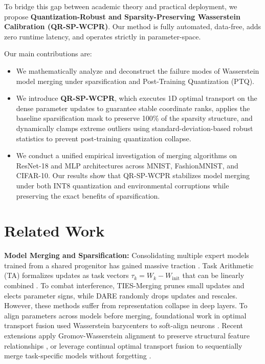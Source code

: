 \documentclass{article}
\theoremstyle{plain}
\theoremstyle{definition}
\theoremstyle{remark}
\begin{document}
To bridge this gap between academic theory and practical deployment, we propose \textbf{Quantization-Robust and Sparsity-Preserving Wasserstein Calibration (QR-SP-WCPR)}. Our method is fully automated, data-free, adds zero runtime latency, and operates strictly in parameter-space. 

Our main contributions are:
\begin{itemize}
    \item We mathematically analyze and deconstruct the failure modes of Wasserstein model merging under sparsification and Post-Training Quantization (PTQ).
    \item We introduce \textbf{QR-SP-WCPR}, which executes 1D optimal transport on the dense parameter updates to guarantee stable coordinate ranks, applies the baseline sparsification mask to preserve 100\% of the sparsity structure, and dynamically clamps extreme outliers using standard-deviation-based robust statistics to prevent post-training quantization collapse.
    \item We conduct a unified empirical investigation of merging algorithms on ResNet-18 and MLP architectures across MNIST, FashionMNIST, and CIFAR-10. Our results show that QR-SP-WCPR stabilizes model merging under both INT8 quantization and environmental corruptions while preserving the exact benefits of sparsification.
\end{itemize}

\section{Related Work}
\label{sec:related}
\textbf{Model Merging and Sparsification:} Consolidating multiple expert models trained from a shared progenitor has gained massive traction \cite{wortsman2022robust}. Task Arithmetic (TA) formalizes updates as task vectors $\tau_k = W_k - W_{\text{init}}$ that can be linearly combined \cite{ilharco23editing}. To combat interference, TIES-Merging \cite{yadav2023ties} prunes small updates and elects parameter signs, while DARE \cite{tokuda2024dare} randomly drops updates and rescales. However, these methods suffer from representation collapse in deep layers. To align parameters across models before merging, foundational work in optimal transport fusion used Wasserstein barycenters to soft-align neurons \cite{singh2020model}. Recent extensions apply Gromov-Wasserstein alignment to preserve structural feature relationships \cite{gw2025efficient}, or leverage continual optimal transport fusion to sequentially merge task-specific models without forgetting \cite{pan2025merging}.
\end{document}
